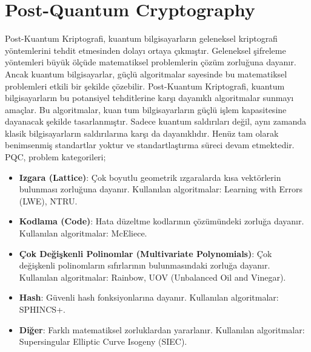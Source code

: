 \section{Post-Quantum Cryptography}

Post-Kuantum Kriptografi, kuantum bilgisayarların geleneksel kriptografi yöntemlerini tehdit etmesinden dolayı ortaya çıkmıştır. Geleneksel şifreleme yöntemleri büyük ölçüde matematiksel problemlerin çözüm zorluğuna dayanır. Ancak kuantum bilgisayarlar, güçlü algoritmalar sayesinde bu matematiksel problemleri etkili bir şekilde çözebilir. Post-Kuantum Kriptografi, kuantum bilgisayarların bu potansiyel tehditlerine karşı dayanıklı algoritmalar sunmayı amaçlar. Bu algoritmalar, kuan tum bilgisayarların güçlü işlem kapasitesine dayanacak şekilde tasarlanmıştır. Sadece kuantum saldırıları değil, aynı zamanda klasik bilgisayarların saldırılarına karşı da dayanıklıdır. Henüz tam olarak benimsenmiş standartlar yoktur ve standartlaştırma süreci devam etmektedir. PQC, problem kategorileri;

\begin{itemize}
    \item \textbf{Izgara (Lattice)}: Çok boyutlu geometrik ızgaralarda kısa vektörlerin bulunması zorluğuna dayanır. Kullanılan algoritmalar: Learning with Errors (LWE), NTRU.
    \item \textbf{Kodlama (Code)}: Hata düzeltme kodlarının çözümündeki zorluğa dayanır. Kullanılan algoritmalar: McEliece.
    \item \textbf{Çok Değişkenli Polinomlar (Multivariate Polynomials)}: Çok değişkenli polinomların sıfırlarının bulunmasındaki zorluğa dayanır. Kullanılan algoritmalar: Rainbow, UOV (Unbalanced Oil and Vinegar).
    \item \textbf{Hash}: Güvenli hash fonksiyonlarına dayanır. Kullanılan algoritmalar: SPHINCS+.
    \item \textbf{Diğer}: Farklı matematiksel zorluklardan yararlanır. Kullanılan algoritmalar: Supersingular Elliptic Curve Isogeny (SIEC).
\end{itemize}

\newpage